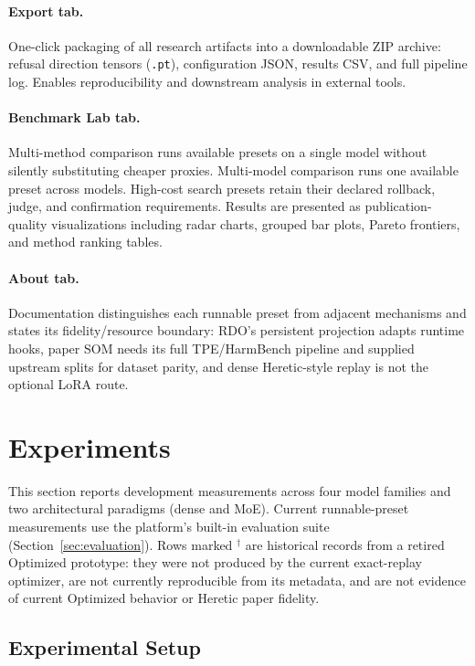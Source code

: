 \documentclass[11pt]{article}
\begin{document}
\paragraph{Export tab.}
One-click packaging of all research artifacts into a downloadable ZIP archive: refusal direction tensors (\texttt{.pt}), configuration JSON, results CSV, and full pipeline log. Enables reproducibility and downstream analysis in external tools.

\paragraph{Benchmark Lab tab.}
Multi-method comparison runs available presets on a single model without silently substituting cheaper proxies. Multi-model comparison runs one available preset across models. High-cost search presets retain their declared rollback, judge, and confirmation requirements. Results are presented as publication-quality visualizations including radar charts, grouped bar plots, Pareto frontiers, and method ranking tables.

\paragraph{About tab.}
Documentation distinguishes each runnable preset from adjacent mechanisms and states its fidelity/resource boundary: RDO's persistent projection adapts runtime hooks, paper SOM needs its full TPE/HarmBench pipeline and supplied upstream splits for dataset parity, and dense Heretic-style replay is not the optional LoRA route.

\section{Experiments}
\label{sec:experiments}

This section reports development measurements across four model families and two architectural paradigms (dense and MoE). Current runnable-preset measurements use the platform's built-in evaluation suite (Section~\ref{sec:evaluation}). Rows marked $^\dagger$ are historical records from a retired Optimized prototype: they were not produced by the current exact-replay optimizer, are not currently reproducible from its metadata, and are not evidence of current Optimized behavior or Heretic paper fidelity.

\subsection{Experimental Setup}
\label{sec:exp_setup}
\end{document}
